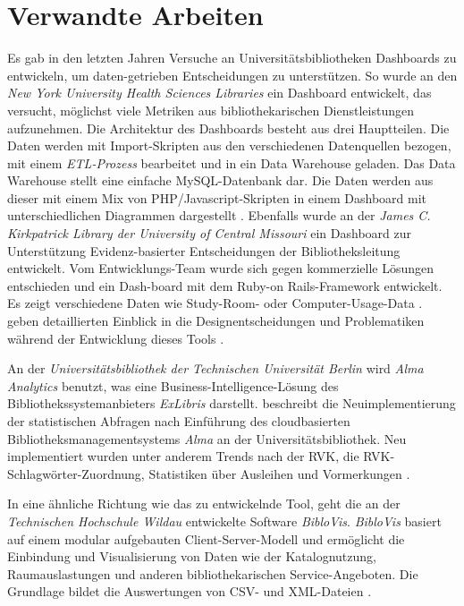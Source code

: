 \section{Verwandte Arbeiten}
Es gab in den letzten Jahren Versuche an Universitätsbibliotheken Dashboards zu entwickeln, um daten-getrieben Entscheidungen zu unterstützen.
So wurde an den \textit{New York University Health Sciences Libraries} ein Dashboard entwickelt, das versucht, möglichst viele Metriken
aus bibliothekarischen Dienstleistungen aufzunehmen. Die Architektur des Dashboards besteht aus drei Hauptteilen. Die Daten werden mit 
Import-Skripten aus den verschiedenen Datenquellen bezogen, mit einem \textit{\acrshort{ETL}-Prozess} bearbeitet und in ein Data Warehouse geladen. Das Data Warehouse 
stellt eine einfache MySQL-Datenbank dar. Die Daten werden aus dieser mit einem Mix von PHP/Javascript-Skripten in einem Dashboard mit unterschiedlichen Diagrammen
dargestellt \cite{morton-owens_trends_2012}. Ebenfalls wurde an der \textit{James C. Kirkpatrick Library der University of Central Missouri} ein Dashboard zur Unterstützung Evidenz-basierter Entscheidungen der Bibliotheksleitung entwickelt. 
Vom Entwicklungs-Team wurde sich gegen kommerzielle Lösungen entschieden und ein Dash-board mit dem Ruby-on Rails-Framework entwickelt. Es zeigt verschiedene Daten wie Study-Room- oder Computer-Usage-Data \cite{james_c_kirkpatrick_library_jckl_2020}.
\citeauthor{horne-popp_if_2018} geben detaillierten Einblick in die Designentscheidungen und Problematiken während der Entwicklung dieses Tools \cite[vgl.][194 ff.]{horne-popp_if_2018}. 

An der \textit{Universitätsbibliothek der Technischen Universität Berlin} wird \textit{Alma Analytics} benutzt, was eine Business-Intelligence-Lösung des Bibliothekssystemanbieters \textit{ExLibris} darstellt. 
 beschreibt die Neuimplementierung der statistischen Abfragen nach Einführung des cloudbasierten Bibliotheksmanagementsystems \textit{Alma} an der Universitätsbibliothek.
Neu implementiert wurden unter anderem Trends nach der \acrfull{RVK}, die RVK-Schlagwörter-Zuordnung, Statistiken über Ausleihen und Vormerkungen \cite{golas_statistische_2018}.

In eine ähnliche Richtung wie das zu entwickelnde Tool, geht die an der \textit{Technischen Hochschule Wildau} entwickelte Software \textit{BibloVis}.
\textit{BibloVis} basiert auf einem modular aufgebauten Client-Server-Modell und ermöglicht die Einbindung und Visualisierung von Daten wie
der Katalognutzung, Raumauslastungen und  anderen bibliothekarischen Service-Angeboten. Die Grundlage bildet die Auswertungen von CSV-
und XML-Dateien \cite{block_biblovis_2015}.

